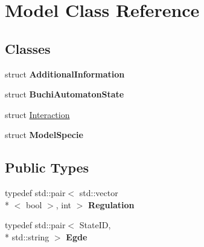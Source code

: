 \hypertarget{class_model}{\section{Model Class Reference}
\label{class_model}
}
\subsection*{Classes}
\begin{DoxyCompactItemize}
\item 
struct {\bfseries Additional\-Information}
\item 
struct {\bfseries Buchi\-Automaton\-State}
\item 
struct \hyperlink{struct_model_1_1_interaction}{Interaction}
\item 
struct {\bfseries Model\-Specie}
\end{DoxyCompactItemize}
\subsection*{Public Types}
\begin{DoxyCompactItemize}
\item 
\hypertarget{class_model_a419db40262b04731de6c47c4aaf101ed}{typedef std\-::pair$<$ std\-::vector\\*
$<$ bool $>$, int $>$ {\bfseries Regulation}}\label{class_model_a419db40262b04731de6c47c4aaf101ed}

\item 
\hypertarget{class_model_a20d1a8ad1917da40f12e7ceb1f87d707}{typedef std\-::pair$<$ State\-I\-D, \\*
std\-::string $>$ {\bfseries Egde}}\label{class_model_a20d1a8ad1917da40f12e7ceb1f87d707}

\end{DoxyCompactItemize}
